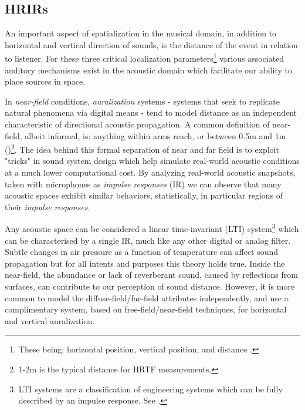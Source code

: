 \subsection{HRIRs}\label{subsec:hrirs}

An important aspect of spatialization in the musical domain, in addition to horizontal and vertical direction of sounds, is the distance of the event in relation to listener. For these three critical localization parameters\footnote{These being: horizontal position, vertical position, and distance .} various associated auditory mechanisms exist in the acoustic domain which facilitate our ability to place sources in space. 

In \textit{near-field} conditions, \textit{auralization} systems - systems that seek to replicate natural phenomena via digital means - tend to model distance as an independent characteristic of directional acoustic propagation. A common definition of near-field, albeit informal, is: anything within arms reach, or between 0.5m and 1m (\cite{Betbeder.2017})\footnote{1-2m is the typical distance for HRTF measurements.}. The idea behind this formal separation of near and far field is to exploit "tricks" in sound system design which help simulate real-world acoustic conditions at a much lower computational cost. By analyzing real-world acoustic snapshots, taken with microphones as \textit{impulse responses} (IR) we can observe that many acoustic spaces exhibit similar behaviors, statistically, in particular regions of their \textit{impulse responses}. 

Any acoustic space can be considered a linear time-invariant (LTI) system\footnote{LTI systems are a classification of engineering systems which can be fully described by an impulse response. See \cite{LinearTi32:online}.} which can be characterised by a single IR, much like any other digital or analog filter. Subtle changes in air pressure as a function of temperature can affect sound propagation but for all intents and purposes this theory holds true. Inside the near-field, the abundance or lack of reverberant sound, caused by reflections from surfaces, can contribute to our perception of sound distance. However, it is more common to model the diffuse-field/far-field attributes independently, and use a complimentary system, based on free-field/near-field techniques, for horizontal and vertical auralization.

